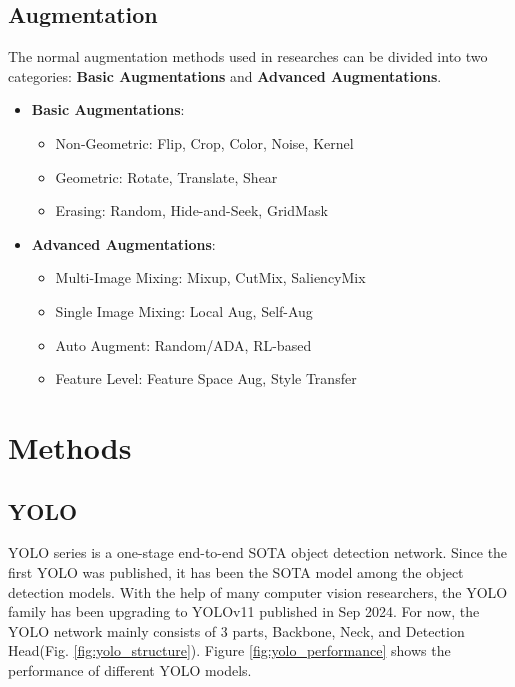 \documentclass[10pt]{article}
\begin{document}
\subsection{Augmentation}
The normal augmentation methods used in researches can be divided into two categories: \textbf{Basic Augmentations} and \textbf{Advanced Augmentations}.
\begin{small}
\begin{itemize}[leftmargin=*,nosep]
\item \textbf{Basic Augmentations}:
    \begin{itemize}[nosep]
    \item Non-Geometric: Flip, Crop, Color, Noise, Kernel
    \item Geometric: Rotate, Translate, Shear 
    \item Erasing: Random, Hide-and-Seek, GridMask
    \end{itemize}
\item \textbf{Advanced Augmentations}:
    \begin{itemize}[nosep] 
    \item Multi-Image Mixing: Mixup, CutMix, SaliencyMix
    \item Single Image Mixing: Local Aug, Self-Aug
    \item Auto Augment: Random/ADA, RL-based
    \item Feature Level: Feature Space Aug, Style Transfer
    \end{itemize}
\end{itemize}
\end{small}

\section{Methods}
\subsection{YOLO}
YOLO series is a one-stage end-to-end SOTA object detection network. Since the first YOLO was published, it has been the SOTA model among the object detection models. With the help of many computer vision researchers, the YOLO family has been upgrading to YOLOv11 \cite{jocher2024yolo11} published in Sep 2024. For now, the YOLO network mainly consists of 3 parts, Backbone, Neck, and Detection Head(Fig. \ref{fig:yolo_structure}). Figure \ref{fig:yolo_performance} shows the performance of different YOLO models.
\end{document}
